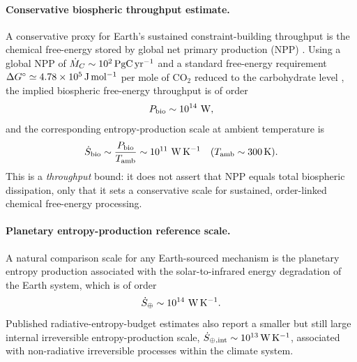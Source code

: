 \documentclass[10pt]{article}
\begin{document}
\paragraph{Conservative biospheric throughput estimate.}
A conservative proxy for Earth’s sustained constraint-building throughput is the chemical free-energy
stored by global net primary production (NPP) \cite{Field1998NPP,BioNumbersNPP}.
Using a global NPP of
\(\dot M_C \sim 10^2\,{\rm PgC\,yr^{-1}}\) and a standard free-energy requirement
\(\Delta G^\circ \simeq 4.78\times 10^5\,{\rm J\,mol^{-1}}\) per mole of CO\(_2\) reduced to the
carbohydrate level \cite{Whitmarsh478kJ}, the implied biospheric free-energy throughput is of order
\begin{equation}
P_{\rm bio} \sim 10^{14}\ {\rm W},
\end{equation}
and the corresponding entropy-production scale at ambient temperature is
\begin{equation}
\dot S_{\rm bio} \sim \frac{P_{\rm bio}}{T_{\rm amb}}
\sim 10^{11}\ {\rm W\,K^{-1}}
\quad (T_{\rm amb}\sim 300\,{\rm K}).
\end{equation}
This is a \emph{throughput} bound: it does not assert that NPP equals total biospheric dissipation,
only that it sets a conservative scale for sustained, order-linked chemical free-energy processing.

\paragraph{Planetary entropy-production reference scale.}
A natural comparison scale for any Earth-sourced mechanism is the planetary entropy production
associated with the solar-to-infrared energy degradation of the Earth system, which is of order
\cite{Kleidon2010HierarchyMEP}
\begin{equation}
\dot S_{\oplus} \sim 10^{14}\ {\rm W\,K^{-1}}.
\end{equation}
Published radiative-entropy-budget estimates also report a smaller but still large internal
irreversible entropy-production scale,
\(\dot S_{\oplus,{\rm int}}\sim 10^{13}\,{\rm W\,K^{-1}}\),
associated with non-radiative irreversible processes within the climate system.
\end{document}

